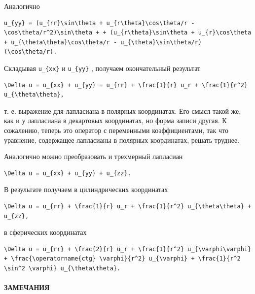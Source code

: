 \documentclass[
  ukrainian,
]{article}
\begin{document}
Аналогично

\begin{verbatim}
u_{yy} = (u_{rr}\sin\theta + u_{r\theta}\cos\theta/r - \cos\theta/r^2)\sin\theta + + (u_{r\theta}\sin\theta + u_{r}\cos\theta + u_{\theta\theta}\cos\theta/r - u_{\theta}\sin\theta/r)(\cos\theta/r).
\end{verbatim}

Складывая \texttt{u\_\{xx\}} и \texttt{u\_\{yy\}} , получаем
окончательный результат

\begin{verbatim}
\Delta u = u_{xx} + u_{yy} = u_{rr} + \frac{1}{r} u_r + \frac{1}{r^2} u_{\theta\theta},
\end{verbatim}

т. е. выражение для лапласиана в полярных координатах. Его смысл такой
же, как и у лапласиана в декартовых координатах, но форма записи другая.
К сожалению, теперь это оператор с переменными коэффициентами, так что
уравнение, содержащее лапласианы в полярных координатах, решать труднее.

Аналогично можно преобразовать и трехмерный лапласиан

\begin{verbatim}
\Delta u = u_{xx} + u_{yy} + u_{zz}.
\end{verbatim}

В результате получаем в цилиндрических координатах

\begin{verbatim}
\Delta u = u_{rr} + \frac{1}{r} u_r + \frac{1}{r^2} u_{\theta\theta} + u_{zz},
\end{verbatim}

в сферических координатах

\begin{verbatim}
\Delta u = u_{rr} + \frac{2}{r} u_r + \frac{1}{r^2} u_{\varphi\varphi} + \frac{\operatorname{ctg} \varphi}{r^2} u_{\varphi} + \frac{1}{r^2 \sin^2 \varphi} u_{\theta\theta}.
\end{verbatim}

\paragraph{ЗАМЕЧАНИЯ}\label{ux437ux430ux43cux435ux447ux430ux43dux438ux44f-7}
\end{document}
